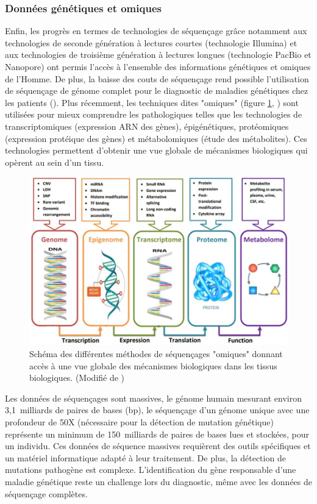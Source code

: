 \subsubsection{Données génétiques et omiques}
Enfin, les progrès en termes de technologies de séquençage grâce notamment aux technologies de seconde génération à lectures courtes (technologie Illumina) et aux technologies de troisième génération à lectures longues (technologie PacBio et Nanopore) ont permis l'accès à l'ensemble des informations génétiques et omiques de l'Homme. De plus, la baisse des couts de séquençage rend possible l'utilisation de séquençage de génome complet pour le diagnostic de maladies génétiques chez les patients (\cite{rabbani_next-generation_2012}). Plus récemment, les techniques dites "omiques" (figure \ref{fig:intro-omics}, \cite{momeni_survey_2020}) sont utilisées pour mieux comprendre les pathologiques telles que les technologies de transcriptomiques (expression ARN des gènes), épigénétiques, protéomiques (expression protéique des gènes) et métabolomiques (étude des métabolites). Ces technologies permettent d'obtenir une vue globale de mécanismes biologiques qui opèrent au sein d'un tissu. 
\begin{figure}[!htbp]
 \centering
 \includegraphics[width=1\textwidth]{figures/intro_omics.png}
 \caption[Méthodes de séquençages "omiques"]{Schéma des différentes méthodes de séquençages "omiques" donnant accès à une vue globale des mécanismes biologiques dans les tissus biologiques. (Modifié de \cite{momeni_survey_2020})}
 \label{fig:intro-omics}
\end{figure}
Les données de séquençages sont massives, le génome humain mesurant environ 3,1~milliards de paires de bases (bp), le séquençage d'un génome unique avec une profondeur de 50X (nécessaire pour la détection de mutation génétique) représente un minimum de 150~milliards de paires de bases lues et stockées, pour un individu. Ces données de séquence massives requièrent des outils spécifiques et un matériel informatique adapté à leur traitement. De plus, la détection de mutations pathogène est complexe. L'identification du gène responsable d'une maladie génétique reste un challenge lors du diagnostic, même avec les données de séquençage complètes.

